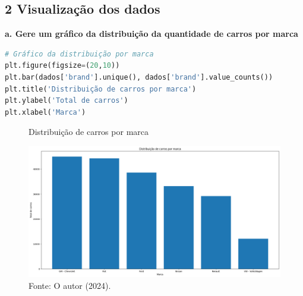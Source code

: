 \subsection*{\textbf{2 Visualização dos dados}}
\begin{adjustwidth}{1em}{}
\textbf{a. Gere um gráfico da distribuição da quantidade de carros por marca}
\end{adjustwidth}
\begin{lstlisting}[language=Python, style=input]
# Gráfico da distribuição por marca
plt.figure(figsize=(20,10)) 
plt.bar(dados['brand'].unique(), dados['brand'].value_counts()) 
plt.title('Distribuição de carros por marca') 
plt.ylabel('Total de carros') 
plt.xlabel('Marca') 
\end{lstlisting}
\begin{figure}[H]
\centering
\caption{Distribuição de carros por marca}
\includegraphics[width=1\linewidth]{apendices/fig/2_IAA002_1.png}
\caption*{Fonte: O autor (2024).}
\end{figure}

